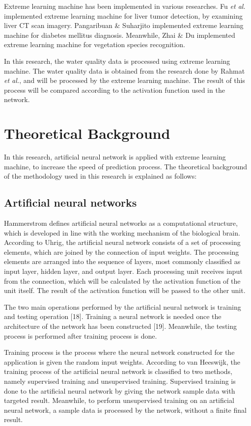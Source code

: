 \documentclass{ws-ijait}
\begin{document}
Extreme learning machine has been implemented in various researches. Fu \textit{et al.}\cite{13} implemented extreme learning machine for liver tumor detection, by examining liver CT scan imagery. Pangaribuan \& Suharjito\cite{14} implemented extreme learning machine for diabetes mellitus diagnosis. Meanwhile, Zhai \& Du\cite{15} implemented extreme learning machine for vegetation species recognition.

In this research, the water quality data is processed using extreme learning machine. The water quality data is obtained from the research done by Rahmat \textit{et al.}\cite{16}, and will be processed by the extreme learning machine. The result of this process will be compared according to the activation function used in the network.

\section{Theoretical Background}

In this research, artificial neural network is applied with extreme learning machine, to increase the speed of prediction process. The theoretical background of the methodology used in this research is explained as follows:

\subsection{Artificial neural networks}

Hammerstrom\cite{17} defines artificial neural networks as a computational structure, which is developed in line with the working mechanism of the biological brain. According to Uhrig\cite{18}, the artificial neural network consists of a set of processing elements, which are joined by the connection of input weights. The processing elements are arranged into the sequence of layers, most commonly classified as input layer, hidden layer, and output layer. Each processing unit receives input from the connection, which will be calculated by the activation function of the unit itself. The result of the activation function will be passed to the other unit.

The two main operations performed by the artificial neural network is training and testing operation [18]. Training a neural network is needed once the architecture of the network has been constructed [19]. Meanwhile, the testing process is performed after training process is done.

Training process is the process where the neural network constructed for the application is given the random input weights. According to van Heeswijk\cite{20}, the training process of the artificial neural network is classified to two methods, namely supervised training and unsupervised training. Supervised training is done to the artificial neural network by giving the network sample data with targeted result. Meanwhile, to perform unsupervised training on an artificial neural network, a sample data is processed by the network, without a finite final result.
\end{document}

